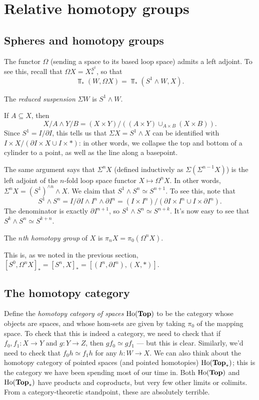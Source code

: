 \section{Relative homotopy groups}
\subsection{Spheres and homotopy groups}
The functor $\Omega$ (sending a space to its based loop space) admits a left adjoint.
To see this, recall that $\Omega X = X^{S^1}_\ast$, so that
$$\Top_\ast(W,\Omega X) = \Top_\ast(S^1\wedge W,X).$$
\begin{definition}
    The \emph{reduced suspension} $\Sigma W$ is $S^1\wedge W$.
\end{definition}
If $A\subseteq X$, then
$$X/A\wedge Y/B = (X\times Y)/((A\times Y)\cup_{A\times B}(X\times B)).$$
Since $S^1 = I/\partial I$, this tells us that $\Sigma X = S^1\wedge X$ can be identified with
$I\times X/(\partial I \times X\cup I\times \ast)$: in other words, we collapse the top and bottom of a cylinder to a point,
as well as the line along a basepoint.

The same argument says that $\Sigma^n X$ (defined inductively as $\Sigma(\Sigma^{n-1} X)$)
is the left adjoint of the $n$-fold loop space functor $X\mapsto \Omega^n X$.
In other words, $\Sigma^n X = (S^1)^{\wedge n}\wedge X$.
We claim that $S^1\wedge S^n \simeq S^{n+1}$.
To see this, note that
$$S^1\wedge S^n = I/\partial I\wedge I^n\wedge \partial I^n = (I\times I^n)/(\partial I\times I^n\cup I\times \partial I^n).$$
The denominator is exactly $\partial I^{n+1}$, so $S^1\wedge S^n\simeq S^{n+k}$.
It's now easy to see that $S^k\wedge S^n\simeq S^{k+n}$.
\begin{definition}
    The \emph{$n$th homotopy group} of $X$ is $\pi_n X = \pi_0(\Omega^n X)$.
\end{definition}
This is, as we noted in the previous section, $[S^0,\Omega^n X]_\ast = [S^n, X]_\ast = [(I^n,\partial I^n),(X,\ast)]$.

\subsection{The homotopy category}
Define the \emph{homotopy category of spaces} $\mathrm{Ho}(\mathbf{Top})$ to be the category
whose objects are spaces, and whose hom-sets are given by taking $\pi_0$ of the mapping space.
To check that this is indeed a category, we need to check that if $f_0,f_1:X\to Y$ and $g:Y\to Z$, then $gf_0\simeq gf_1$ ---
but this is clear.
Similarly, we'd need to check that $f_0h\simeq f_1h$ for any $h:W\to X$.
We can also think about the homotopy category of pointed spaces (and pointed homotopies) $\mathrm{Ho}(\mathbf{Top}_\ast)$; this is the category
we have been spending most of our time in.
Both $\mathrm{Ho}(\mathbf{Top})$ and $\mathrm{Ho}(\mathbf{Top}_\ast)$ have products and coproducts, but very few other limits or colimits.
From a category-theoretic standpoint, these are absolutely terrible.

